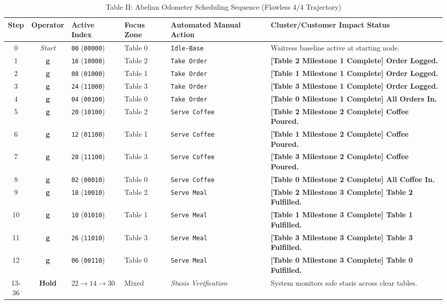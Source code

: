 \documentclass[11pt,journal,onecolumn]{IEEEtran}
\begin{document}
\begin{table}[htbp]
\caption{Table II: Abelian Odometer Scheduling Sequence (Flawless 4/4 Trajectory)}
\label{tab:odometer}
\centering
\begin{tabular}{ccllll}
\toprule
\textbf{Step} & \textbf{Operator} & \textbf{Active Index} & \textbf{Focus Zone} & \textbf{Automated Manual Action} & \textbf{Cluster/Customer Impact Status} \\
\midrule
0  & \textit{Start} & \texttt{00} (\texttt{00000}) & Table 0 & \texttt{Idle-Base} & Waitress baseline active at starting node. \\
1  & \textbf{g}     & \texttt{16} (\texttt{10000}) & Table 2 & \texttt{Take Order} & \textbf{[Table 2 Milestone 1 Complete] Order Logged.} \\
2  & \textbf{g}     & \texttt{08} (\texttt{01000}) & Table 1 & \texttt{Take Order} & \textbf{[Table 1 Milestone 1 Complete] Order Logged.} \\
3  & \textbf{g}     & \texttt{24} (\texttt{11000}) & Table 3 & \texttt{Take Order} & \textbf{[Table 3 Milestone 1 Complete] Order Logged.} \\
4  & \textbf{g}     & \texttt{04} (\texttt{00100}) & Table 0 & \texttt{Take Order} & \textbf{[Table 0 Milestone 1 Complete] All Orders In.} \\
5  & \textbf{g}     & \texttt{20} (\texttt{10100}) & Table 2 & \texttt{Serve Coffee} & \textbf{[Table 2 Milestone 2 Complete] Coffee Poured.} \\
6  & \textbf{g}     & \texttt{12} (\texttt{01100}) & Table 1 & \texttt{Serve Coffee} & \textbf{[Table 1 Milestone 2 Complete] Coffee Poured.} \\
7  & \textbf{g}     & \texttt{28} (\texttt{11100}) & Table 3 & \texttt{Serve Coffee} & \textbf{[Table 3 Milestone 2 Complete] Coffee Poured.} \\
8  & \textbf{g}     & \texttt{02} (\texttt{00010}) & Table 0 & \texttt{Serve Coffee} & \textbf{[Table 0 Milestone 2 Complete] All Coffee In.} \\
9  & \textbf{g}     & \texttt{18} (\texttt{10010}) & Table 2 & \texttt{Serve Meal} & \textbf{[Table 2 Milestone 3 Complete] Table 2 Fulfilled.} \\
10 & \textbf{g}     & \texttt{10} (\texttt{01010}) & Table 1 & \texttt{Serve Meal} & \textbf{[Table 1 Milestone 3 Complete] Table 1 Fulfilled.} \\
11 & \textbf{g}     & \texttt{26} (\texttt{11010}) & Table 3 & \texttt{Serve Meal} & \textbf{[Table 3 Milestone 3 Complete] Table 3 Fulfilled.} \\
12 & \textbf{g}     & \texttt{06} (\texttt{00110}) & Table 0 & \texttt{Serve Meal} & \textbf{[Table 0 Milestone 3 Complete] Table 0 Fulfilled.} \\
13-36 & \textbf{Hold} & $22 \rightarrow 14 \rightarrow 30$ & Mixed   & \textit{Stasis Verification} & System monitors safe stasis across clear tables. \\
\bottomrule
\end{tabular}
\end{table}
\end{document}
